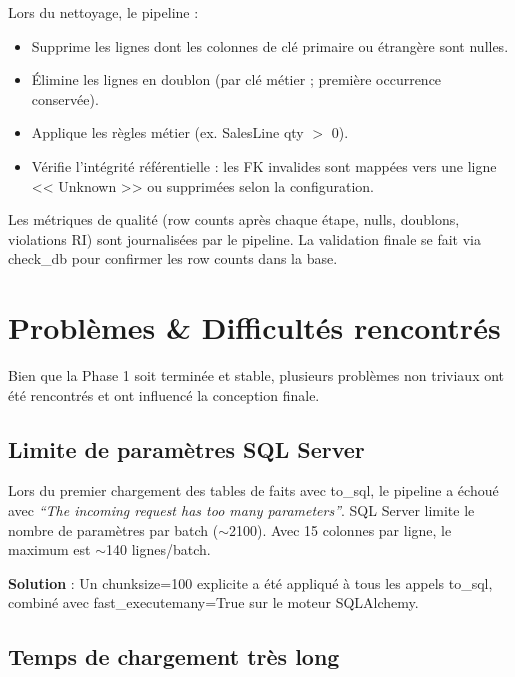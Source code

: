 \documentclass[11pt,a4paper]{article}
\renewcommand{\texttt}[1]{{\ttfamily\small\colorbox{codebg}{\textcolor{darktext}{#1}}}}
\begin{document}
Lors du nettoyage, le pipeline :
\begin{itemize}[noitemsep,leftmargin=1.2em]
  \item Supprime les lignes dont les colonnes de clé primaire ou étrangère sont nulles.
  \item Élimine les lignes en doublon (par clé métier ; première occurrence conservée).
  \item Applique les règles métier (ex. SalesLine \texttt{qty} $>$ 0).
  \item Vérifie l'intégrité référentielle : les FK invalides sont mappées vers une ligne << Unknown >> ou supprimées selon la configuration.
\end{itemize}

Les métriques de qualité (row counts après chaque étape, nulls, doublons, violations RI) sont journalisées par le pipeline. La validation finale se fait via \texttt{check\_db} pour confirmer les row counts dans la base.

\section{Problèmes \& Difficultés rencontrés}

Bien que la Phase 1 soit terminée et stable, plusieurs problèmes non triviaux ont été rencontrés et ont influencé la conception finale.

\subsection{Limite de paramètres SQL Server}

\begin{warnbox}
Lors du premier chargement des tables de faits avec \texttt{to\_sql}, le pipeline a échoué avec \textit{``The incoming request has too many parameters''}. SQL Server limite le nombre de paramètres par batch ($\sim$2100). Avec 15 colonnes par ligne, le maximum est $\sim$140 lignes/batch.
\end{warnbox}

\textbf{Solution} : Un \texttt{chunksize=100} explicite a été appliqué à tous les appels \texttt{to\_sql}, combiné avec \texttt{fast\_executemany=True} sur le moteur SQLAlchemy.

\subsection{Temps de chargement très long}
\end{document}
